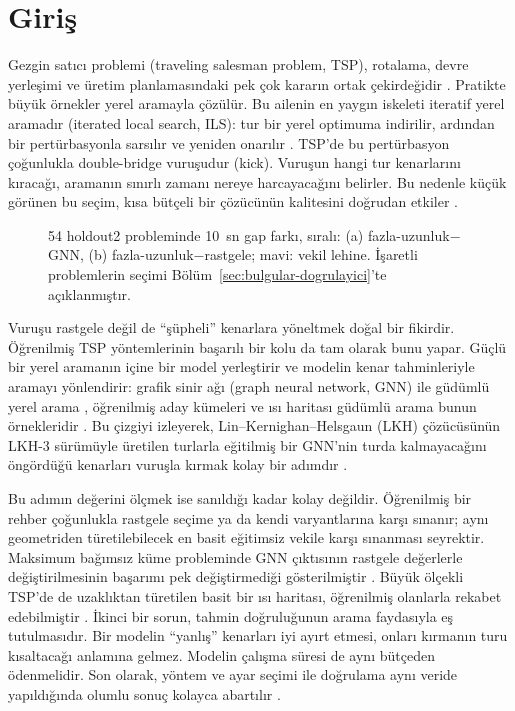 \section{Giriş}\label{sec:giris}

Gezgin satıcı problemi (traveling salesman problem, TSP), rotalama, devre yerleşimi ve üretim
planlamasındaki pek çok kararın ortak çekirdeğidir \citep{reinelt_1991_tsplib, applegate_2006_tsp}.
Pratikte büyük örnekler yerel aramayla çözülür. Bu ailenin en yaygın iskeleti iteratif yerel
aramadır (iterated local search, ILS): tur bir yerel optimuma indirilir, ardından bir pertürbasyonla
sarsılır ve yeniden onarılır \citep{martin_1992_largestep, lourenco_2010_ils}. TSP'de bu pertürbasyon
çoğunlukla double-bridge vuruşudur (kick). Vuruşun hangi tur kenarlarını kıracağı, aramanın sınırlı
zamanı nereye harcayacağını belirler. Bu nedenle küçük görünen bu seçim, kısa bütçeli bir çözücünün
kalitesini doğrudan etkiler \citep{johnson_1997_case, applegate_2003_clk}.

\begin{figure}[!htbp]
\centering

\caption{54 holdout2 probleminde 10~sn gap farkı, sıralı: (a) fazla-uzunluk$-$GNN, (b) fazla-uzunluk$-$rastgele; mavi: vekil lehine. İşaretli problemlerin seçimi Bölüm~\ref{sec:bulgular-dogrulayici}'te açıklanmıştır.}
\label{fig:manset}
\end{figure}

Vuruşu rastgele değil de ``şüpheli'' kenarlara yöneltmek doğal bir fikirdir. Öğrenilmiş TSP
yöntemlerinin başarılı bir kolu da tam olarak bunu yapar. Güçlü bir yerel aramanın içine bir model
yerleştirir ve modelin kenar tahminleriyle aramayı yönlendirir: grafik sinir ağı (graph neural
network, GNN) ile güdümlü yerel arama \citep{hudson_2022_gnngls}, öğrenilmiş aday kümeleri
\citep{xin_2021_neurolkh} ve ısı haritası güdümlü arama \citep{qiu_2022_dimes, sun_2023_difusco}
bunun örnekleridir \citep{karimimamaghan_2022_mlmeta}. Bu çizgiyi izleyerek,
Lin--Kernighan--Helsgaun (LKH) çözücüsünün LKH-3 sürümüyle üretilen turlarla eğitilmiş bir GNN'nin turda kalmayacağını öngördüğü kenarları vuruşla kırmak
kolay bir adımdır \citep{helsgaun_2017_lkh3}.

Bu adımın değerini ölçmek ise sanıldığı kadar kolay değildir. Öğrenilmiş bir rehber çoğunlukla
rastgele seçime ya da kendi varyantlarına karşı sınanır; aynı geometriden türetilebilecek en basit
eğitimsiz vekile karşı sınanması seyrektir. Maksimum bağımsız küme probleminde GNN çıktısının
rastgele değerlerle değiştirilmesinin başarımı pek değiştirmediği gösterilmiştir
\citep{bother_2022_wrong}. Büyük ölçekli TSP'de de uzaklıktan türetilen basit bir ısı haritası,
öğrenilmiş olanlarla rekabet edebilmiştir \citep{xia_2024_rethinking}. İkinci bir sorun, tahmin
doğruluğunun arama faydasıyla eş tutulmasıdır. Bir modelin ``yanlış'' kenarları iyi ayırt etmesi,
onları kırmanın turu kısaltacağı anlamına gelmez. Modelin çalışma süresi de aynı bütçeden
ödenmelidir. Son olarak, yöntem ve ayar seçimi ile doğrulama aynı veride yapıldığında olumlu sonuç
kolayca abartılır \citep{hooker_1995_testing, nosek_2018_prereg}.

